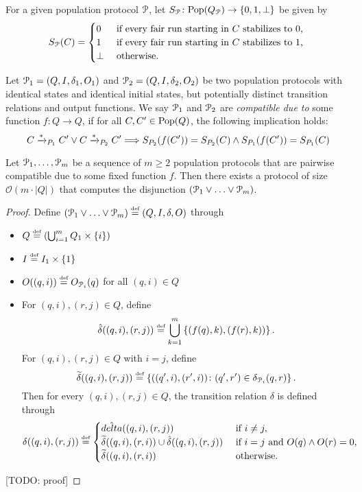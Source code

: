 
For a given population protocol $\mathcal{P}$, let 
$S_{\mathcal{P}} \colon \mathrm{Pop}(Q_{\mathcal{P}}) \rightarrow \left\{0, 1, \bot\right\}$ be given by
$$S_{\mathcal{P}}(C) = \begin{cases}
         0 & \text{ if  every fair run starting in $C$ stabilizes to $0$, } \\
         1 & \text{ if every fair run starting in $C$ stabilizes to $1$, } \\
         \bot & \text{ otherwise. }
         \end{cases}
$$

Let $\mathcal{P}_1 = (Q, I, \delta_1, O_1)$ and $\mathcal{P}_2 = (Q, I, \delta_2, O_2)$ 
be two population protocols with identical states and identical initial states, 
but potentially distinct transition relations and output functions. 
We say $\mathcal{P}_1$ and $\mathcal{P}_2$ are \emph{compatible
due to} some function $f \colon Q \rightarrow Q$, if for all $C, C' \in \mathrm{Pop}(Q)$, 
the following implication holds:
	$$C \xrightarrow{*}_{P_1} C' \lor C \xrightarrow{*}_{P_2} C' 
		\Longrightarrow S_{P_2}(f(C')) = S_{P_2}(C) \land S_{P_1}(f(C')) = S_{P_1}(C)$$

\begin{lemma}
	 Let $\mathcal{P}_1, \ldots, \mathcal{P}_m$ be a sequence of $m \geq 2$  
	population protocols that are pairwise compatible due to some fixed function 
	$f$.
	Then there exists a protocol of size 
	$\mathcal{O}\left(m \cdot  |Q| \right)$ that computes the 
	disjunction $(\mathcal{P}_1 \lor \ldots \lor \mathcal{P}_m)$.
\end{lemma}
\begin{proof}
	Define $(\mathcal{P}_1 \lor \ldots \lor \mathcal{P}_m) \stackrel{\scriptscriptstyle\text{def}}{=} (Q, I, \delta, O)$ through 
	\begin{itemize}
		\item $Q \stackrel{\scriptscriptstyle\text{def}}{=} \left(\bigcup_{i=1}^m Q_1 \times \left\{i\right\}\right)$
		\item $I \stackrel{\scriptscriptstyle\text{def}}{=} I_1 \times \left\{1\right\}$
		\item $O((q, i)) \stackrel{\scriptscriptstyle\text{def}}{=} O_{\mathcal{P}_i}(q)$ for all $(q, i) \in Q$
		\item For $(q, i), (r, j) \in Q$, define 
			  $$\hat{\delta}((q, i), (r, j)) \stackrel{\scriptscriptstyle\text{def}}{=} \bigcup_{k=1}^m 
			  \left\{(f(q), k), (f(r), k))\right\}.$$
			  For $(q, i), (r, j) \in Q$ with $i = j$, define 
			  $$\widetilde{\delta}((q, i), (r, j)) \stackrel{\scriptscriptstyle\text{def}}{=} \left\{((q', i), (r', i)) 
			  \colon (q', r') \in \delta_{\mathcal{P}_i}(q, r)\right\}.$$
			  Then for every $(q, i), (r, j) \in Q$, the transition relation 
			  $\delta$ is defined through
			  $$
			  \delta((q, i), (r, j)) \stackrel{\scriptscriptstyle\text{def}}{=} 
			  \begin{cases}
			  	\hat{delta}((q, i), (r, j)) & \text{ if } i \neq j, \\
			  	\widetilde{\delta}((q, i), (r, i)) \cup \hat{\delta}((q, i), (r, j)) & 
			  	\text{ if } i = j \text{ and } O(q) \land O(r) = 0, \\
			  	\widetilde{\delta}((q, i), (r, i)) & \text{ otherwise.}
			  \end{cases}
			  $$
	\end{itemize}
	[TODO: proof]
\end{proof} 